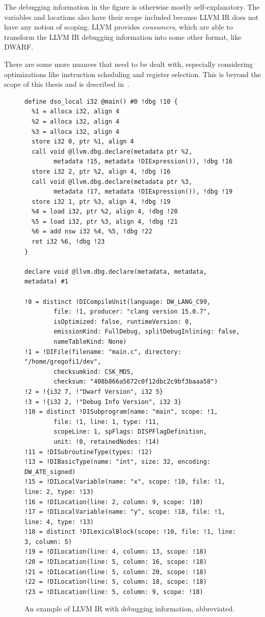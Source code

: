 The debugging information in the figure is otherwise mostly self-explanatory.
The variables and locations also have their scope included because LLVM IR does
not have any notion of scoping. LLVM provides \textit{consumers}, which are
able to transform the LLVM IR debugging information into some other format,
like DWARF.

There are some more nuances that need to be dealt with, especially considering
optimizations like instruction scheduling and register selection. This is
beyond the scope of this thesis and is described in~\cite{llvm-debug-info}.

\begin{figure}
    \begin{verbatim}
define dso_local i32 @main() #0 !dbg !10 {
  %1 = alloca i32, align 4
  %2 = alloca i32, align 4
  %3 = alloca i32, align 4
  store i32 0, ptr %1, align 4
  call void @llvm.dbg.declare(metadata ptr %2,
        metadata !15, metadata !DIExpression()), !dbg !16
  store i32 2, ptr %2, align 4, !dbg !16
  call void @llvm.dbg.declare(metadata ptr %3,
        metadata !17, metadata !DIExpression()), !dbg !19
  store i32 1, ptr %3, align 4, !dbg !19
  %4 = load i32, ptr %2, align 4, !dbg !20
  %5 = load i32, ptr %3, align 4, !dbg !21
  %6 = add nsw i32 %4, %5, !dbg !22
  ret i32 %6, !dbg !23
}

declare void @llvm.dbg.declare(metadata, metadata, metadata) #1

!0 = distinct !DICompileUnit(language: DW_LANG_C99, 
        file: !1, producer: "clang version 15.0.7", 
        isOptimized: false, runtimeVersion: 0, 
        emissionKind: FullDebug, splitDebugInlining: false, 
        nameTableKind: None)
!1 = !DIFile(filename: "main.c", directory: "/home/gregofi1/dev",
        checksumkind: CSK_MD5,
        checksum: "408b866a5672c0f12dbc2c9bf3baaa58")
!2 = !{i32 7, !"Dwarf Version", i32 5}
!3 = !{i32 2, !"Debug Info Version", i32 3}
!10 = distinct !DISubprogram(name: "main", scope: !1,
        file: !1, line: 1, type: !11,
        scopeLine: 1, spFlags: DISPFlagDefinition,
        unit: !0, retainedNodes: !14)
!11 = !DISubroutineType(types: !12)
!13 = !DIBasicType(name: "int", size: 32, encoding: DW_ATE_signed)
!15 = !DILocalVariable(name: "x", scope: !10, file: !1, line: 2, type: !13)
!16 = !DILocation(line: 2, column: 9, scope: !10)
!17 = !DILocalVariable(name: "y", scope: !18, file: !1, line: 4, type: !13)
!18 = distinct !DILexicalBlock(scope: !10, file: !1, line: 3, column: 5)
!19 = !DILocation(line: 4, column: 13, scope: !18)
!20 = !DILocation(line: 5, column: 16, scope: !18)
!21 = !DILocation(line: 5, column: 20, scope: !18)
!22 = !DILocation(line: 5, column: 18, scope: !18)
!23 = !DILocation(line: 5, column: 9, scope: !18)
    \end{verbatim}
    \caption{An example of LLVM IR with debugging information, abbreviated.}
    \label{fig:llvm-ir-debug}
\end{figure}

